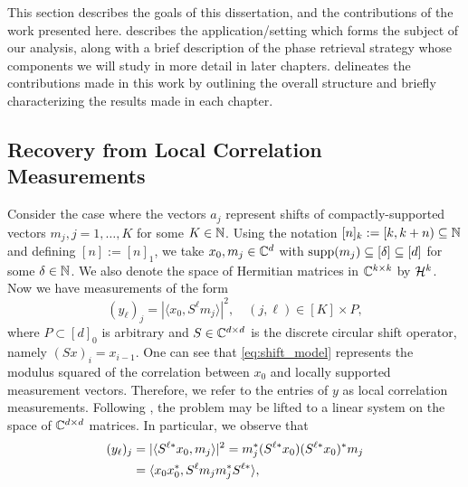 This section describes the goals of this dissertation, and the contributions of the work presented here.   describes the application/setting which forms the subject of our analysis, along with a brief description of the phase retrieval strategy whose components we will study in more detail in later chapters.   delineates the contributions made in this work by outlining the overall structure and briefly characterizing the results made in each chapter.

\subsection{Recovery from Local Correlation Measurements}
\label{sec:locCorrMeas}
Consider the case where the vectors $a_j$ represent shifts of compactly-supported vectors $m_j, j = 1, \ldots, K$ for some $K \in \mathbb{N}$.  Using the notation $[n]_k:=[k, k + n)\subseteq \mathbb{N}$ and defining $[n]:=[n]_1$, we take $x_0, m_j \in \mathbb{C}^d$ with $\operatorname{supp}(m_j)\subseteq[\delta]\subseteq [d]$ for some $\delta \in \mathbb{N}$.  We also denote the space of Hermitian matrices in $\mathbb{C}^{k \times k}$ by $\mathcal{H}^k$.  Now we have measurements of the form \begin{equation} (y_\ell)_j = |\langle x_0, S^\ell m_j \rangle|^2, \quad (j, \ell) \in [K] \times P, \label{eq:shift_model} \end{equation} where $P \subset [d]_0$ is arbitrary and $S \in \mathbb{C}^{d \times d}$ is the discrete circular shift operator, namely $(S x)_i = x_{i-1}$.  One can see that \eqref{eq:shift_model} represents the modulus squared of the correlation between $x_0$ and locally supported measurement vectors.  Therefore, we refer to the entries of $y$ as local correlation measurements.  Following \cite{balan2006signal,candes2012phaselift,IVW2015_FastPhase}, the problem may be lifted to a linear system on the space of $\mathbb{C}^{d \times d}$ matrices.  In particular, we observe that
\begin{align*}
	(y_\ell)_j &= \lvert\langle S^{\ell *} x_0, m_j\rangle\rvert^2 = m_j^* (S^{\ell *} x_0) (S^{\ell *} x_0)^* m_j \\
	&= \langle x_0 x_0^*, S^\ell m_j m_j^* S^{\ell *}\rangle,
\end{align*}
